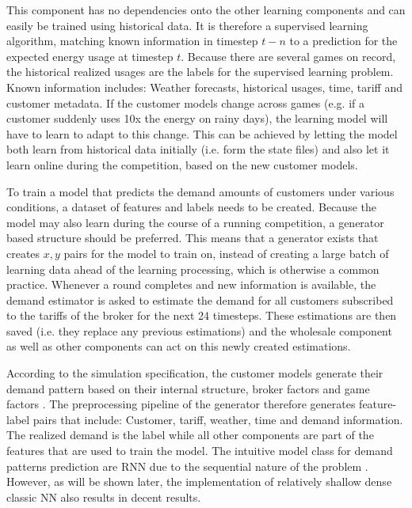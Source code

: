 {This component has no dependencies onto the other learning components and can easily be trained using historical data.
It is therefore a supervised learning algorithm, matching known information in timestep $t-n$ to a prediction for the
expected energy usage at timestep $t$. Because there are several games on record, the historical realized usages are the
labels for the supervised learning problem. Known information includes: Weather forecasts, historical usages, time, tariff
and customer metadata. 
If the customer models change across games (e.g. if a customer suddenly uses 10x the energy on rainy days), the learning
model will have to learn to adapt to this change. This can be achieved by letting the model both learn from historical
data initially (i.e. form the state files) and also let it learn online during the competition, based on the new
customer models.  

To train a model that predicts the demand amounts of customers under various conditions, a dataset of features and
labels needs to be created. Because the model may also learn during the course of a running competition, a generator based structure should be preferred. This means that a generator
exists that creates $x, y$ pairs for the model to train on, instead of creating a large batch of learning data ahead of
the learning processing, which is otherwise a common practice. Whenever a round completes and new information is
available, the demand estimator is asked to estimate the demand for all customers subscribed to the tariffs of the
broker for the next 24 timesteps. These estimations are then saved (i.e. they replace any previous estimations) and the
wholesale component as well as other components can act on this newly created estimations. 

According to the simulation specification, the customer models generate their demand pattern based on their internal
structure, broker factors and game factors \citep[]{ketter2018powertac}. The preprocessing pipeline of the generator therefore generates
feature-label pairs that include: Customer, tariff, weather, time and demand information. The realized demand is the
label while all other components are part of the features that are used to train the model. The intuitive model class
for demand patterns prediction are \ac {RNN} due to the sequential nature of the problem \citep[]{EvalGRU2014}. However,
as will be shown later, the implementation of relatively shallow dense classic \ac {NN} also results in decent results. 

}
